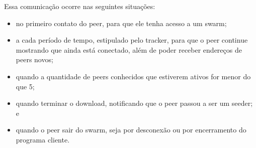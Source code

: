 Essa comunicação ocorre nas seguintes situações:

\begin{itemize}
    \item no primeiro contato do \gls*{peer}, para que ele tenha acesso a um
        \gls*{swarm};

    \item a cada período de tempo, estipulado pelo tracker, para que o \gls*{peer}
        continue mostrando que ainda está conectado, além de poder receber endereços de
        \glspl*{peer} novos;

    \item quando a quantidade de \glspl*{peer} conhecidos que estiverem ativos for
        menor do que 5;

    \item quando terminar o download, notificando que o \gls*{peer} passou a ser um
        \gls*{seeder}; e

    \item quando o \gls*{peer} sair do \gls*{swarm}, seja por desconexão ou por
        encerramento do programa cliente.
\end{itemize}
